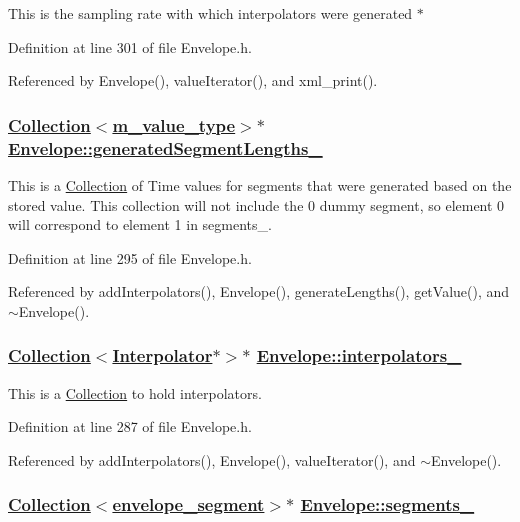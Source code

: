 This is the sampling rate with which interpolators were generated $\ast$ 

Definition at line 301 of file Envelope.h.

Referenced by Envelope(), value\-Iterator(), and xml\_\-print().\hypertarget{classEnvelope_r2}{
\subsubsection[generatedSegmentLengths\_\-]{\setlength{\rightskip}{0pt plus 5cm}\hyperlink{classCollection}{Collection}$<$\hyperlink{Types_8h_a3}{m\_\-value\_\-type}$>$$\ast$ \hyperlink{classEnvelope_r2}{Envelope::generated\-Segment\-Lengths\_\-}}}
\label{classEnvelope_r2}


This is a \hyperlink{classCollection}{Collection} of Time values for segments that were generated based on the stored value. This collection will not include the 0 dummy segment, so element 0 will correspond to element 1 in segments\_\-. 

Definition at line 295 of file Envelope.h.

Referenced by add\-Interpolators(), Envelope(), generate\-Lengths(), get\-Value(), and $\sim$Envelope().\hypertarget{classEnvelope_r1}{
\subsubsection[interpolators\_\-]{\setlength{\rightskip}{0pt plus 5cm}\hyperlink{classCollection}{Collection}$<$\hyperlink{classInterpolator}{Interpolator}$\ast$$>$$\ast$ \hyperlink{classEnvelope_r1}{Envelope::interpolators\_\-}}}
\label{classEnvelope_r1}


This is a \hyperlink{classCollection}{Collection} to hold interpolators. 

Definition at line 287 of file Envelope.h.

Referenced by add\-Interpolators(), Envelope(), value\-Iterator(), and $\sim$Envelope().\hypertarget{classEnvelope_r0}{
\subsubsection[segments\_\-]{\setlength{\rightskip}{0pt plus 5cm}\hyperlink{classCollection}{Collection}$<$\hyperlink{structenvelope__segment}{envelope\_\-segment}$>$$\ast$ \hyperlink{classEnvelope_r0}{Envelope::segments\_\-}}}
\label{classEnvelope_r0}


